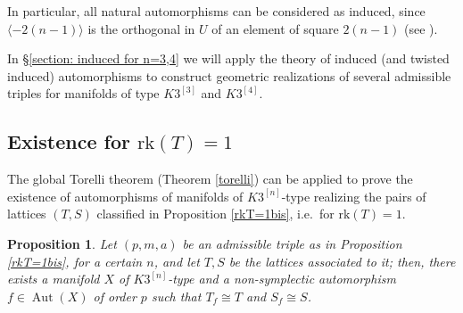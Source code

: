 \documentclass{amsart}
\newtheorem{prop}[theorem]{Proposition}
\theoremstyle{definition}
\newcommand{\rk}{\mathrm{rk}}
\newcommand{\hskt}{K3^{\left[3\right]}}
\newcommand{\hskq}{K3^{\left[4\right]}}
\newcommand{\hskn}{K3^{\left[n\right]}}
\DeclareMathOperator{\aut}{Aut}
\begin{document}
In particular, all natural automorphisms can be considered as induced, since $\langle -2(n-1) \rangle$ is the orthogonal in $U$ of an element of square $2(n-1)$ (see \cite{mw}).

\smallskip
In \S \ref{section: induced for n=3,4} we will apply the theory of induced (and twisted induced) automorphisms to construct geometric realizations of several admissible triples for manifolds of type $\hskt$ and $\hskq$.

\subsection{Existence for $\rk(T) = 1$} \label{subsection: existence for rkT=1}

The global Torelli theorem (Theorem \ref{torelli}) can be applied to prove the existence of automorphisms of manifolds of $\hskn$-type realizing the pairs of lattices $(T,S)$ classified in Proposition \ref{rkT=1bis}, i.e.\ for $\rk(T) = 1$.

\begin{prop}\label{prop: existence for rkT=1}
Let $(p,m,a)$ be an admissible triple as in Proposition \ref{rkT=1bis}, for a certain $n$, and let $T,S$ be the lattices associated to it; then, there exists a manifold $X$ of $\hskn$-type and a non-symplectic automorphism $f \in \aut(X)$ of order $p$ such that $T_f \cong T$ and $S_f \cong S$. 
\end{prop}
\end{document}
